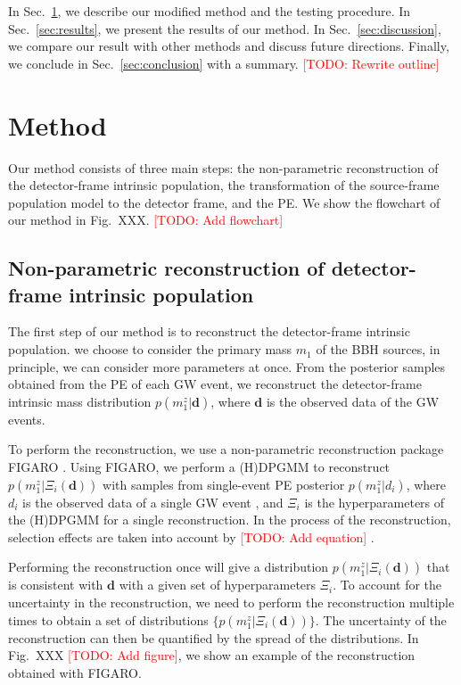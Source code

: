 \documentclass[aps,prd,twocolumn,superscriptaddress,preprintnumbers,nofootinbib,hidelinks]{revtex4-2}
\newcommand{\todo}[1]{\textcolor{red}{[TODO: #1]}}
\begin{document}
In Sec.~\ref{sec:method}, we describe our modified method and the testing procedure.
In Sec.~\ref{sec:results}, we present the results of our method.
In Sec.~\ref{sec:discussion}, we compare our result with other methods and discuss future directions.
Finally, we conclude in Sec.~\ref{sec:conclusion} with a summary.
\todo{Rewrite outline}

\section{Method}
\label{sec:method}

Our method consists of three main steps: the non-parametric reconstruction of the detector-frame intrinsic population, the transformation of the source-frame population model to the detector frame, and the \ac{PE}.
We show the flowchart of our method in Fig.~XXX. \todo{Add flowchart}

\subsection{Non-parametric reconstruction of detector-frame intrinsic population}
\label{sec:reconstruction}

The first step of our method is to reconstruct the detector-frame intrinsic population.
we choose to consider the primary mass $m_1$ of the \ac{BBH} sources, in principle, we can consider more parameters at once.
From the posterior samples obtained from the \ac{PE} of each \ac{GW} event, we reconstruct the detector-frame intrinsic mass distribution $p(m^z_1|\mathbf{d})$, where $\mathbf{d}$ is the observed data of the \ac{GW} events.

To perform the reconstruction, we use a non-parametric reconstruction package \textsc{FIGARO} \citep{Rinaldi:2022kyg}.
Using \textsc{FIGARO}, we perform a \ac{(H)DPGMM} to reconstruct $p(m^z_1|\Xi_i(\mathbf{d}))$ with samples from single-event \ac{PE} posterior $p(m^z_1|d_i)$, where $d_i$ is the observed data of a single \ac{GW} event \citep{Rinaldi:2021bhm}, and $\Xi_i$ is the hyperparameters of the \ac{(H)DPGMM} for a single reconstruction.
In the process of the reconstruction, selection effects are taken into account by \todo{Add equation} \citep{Mandel:2018mve}.

Performing the reconstruction once will give a distribution $p(m^z_1|\Xi_i(\mathbf{d}))$ that is consistent with $\mathbf{d}$ with a given set of hyperparameters $\Xi_i$.
To account for the uncertainty in the reconstruction, we need to perform the reconstruction multiple times to obtain a set of distributions $\{p(m^z_1|\Xi_i(\mathbf{d}))\}$.
The uncertainty of the reconstruction can then be quantified by the spread of the distributions.
In Fig.~XXX \todo{Add figure}, we show an example of the reconstruction obtained with \textsc{FIGARO}.
\end{document}
